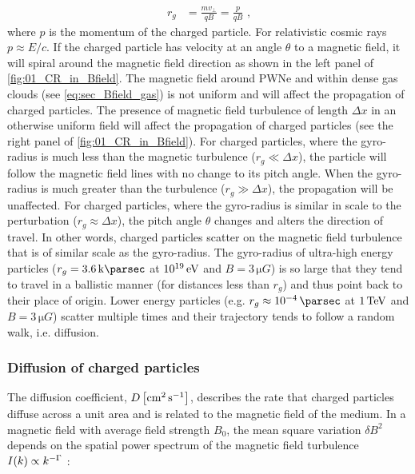 \begin{equation}
    \begin{aligned}
    r_g&=\frac{mv_\perp}{qB}=\frac{p}{qB}\text{ ,}
    \end{aligned} \label{eq:chapter_1_gyro-radius}
\end{equation}
\noindent where $p$ is the momentum of the charged particle. For relativistic cosmic rays $p\approx E/c$. If the charged particle has velocity at an angle $\theta$ to a magnetic field, it will spiral around the magnetic field direction as shown in the left panel of \autoref{fig:01_CR_in_Bfield}.
\newpar 
The magnetic field around PWNe and within dense gas clouds (see \autoref{eq:sec_Bfield_gas}) is not uniform and will affect the propagation of charged particles. The presence of magnetic field turbulence of length $\Delta x$ in an otherwise uniform field will affect the propagation of charged particles (see the right panel of \autoref{fig:01_CR_in_Bfield}). For charged particles, where the gyro-radius is much less than the magnetic turbulence ($r_g\ll \Delta x$), the particle will follow the magnetic field lines with no change to its pitch angle. When the gyro-radius is much greater than the turbulence ($r_g\gg \Delta x$), the propagation will be unaffected. For charged particles, where the gyro-radius is similar in scale to the perturbation ($r_g\approx \Delta x$), the pitch angle $\theta$ changes and alters the direction of travel. In other words, charged particles scatter on the magnetic field turbulence that is of similar scale as the gyro-radius.
\newpar
The gyro-radius of ultra-high energy particles ($r_g=3.6\,\kpc$ at $10^{19}\,\si{\electronvolt}$ and $B=3\,\si{\micro G}$) is so large that they tend to travel in a ballistic manner (for distances less than $r_g$) and thus point back to their place of origin. Lower energy particles (e.g. $r_g\approx 10^{-4}\,\pc$ at $1\,\TeV$ and $B=3\,\si{\micro G}$) scatter multiple times and their trajectory tends to follow a random walk, i.e. diffusion.

\subsubsection{Diffusion of charged particles} 

The diffusion coefficient, $D\,\qty[\si{\centi\meter\squared\per\second}]$, describes the rate that charged particles diffuse across a unit area and is related to the magnetic field of the medium. In a magnetic field with average field strength $B_0$, the mean square variation $\delta B^2$ depends on the spatial power spectrum of the magnetic field turbulence $I\qty(k)\propto k^{-\Gamma}$ \citep{1983RPPh...46..973D,2016MNRAS.461.3552N}:

